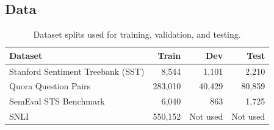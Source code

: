 \subsection{Data}
\begin{table}[H]
\centering
\begin{tabular}{|l|r|r|r|}
\hline
\textbf{Dataset} & \textbf{Train} & \textbf{Dev} & \textbf{Test} \\
\hline
Stanford Sentiment Treebank (SST) & 8,544 & 1,101 & 2,210 \\
\hline
Quora Question Pairs & 283,010 & 40,429 & 80,859 \\
\hline
SemEval STS Benchmark & 6,040 & 863 & 1,725 \\
\hline
SNLI & 	550,152 & Not used & Not used \\
\hline
\end{tabular}
\caption{Dataset splits used for training, validation, and testing.}
\label{tab:dataset_splits}
\end{table}

